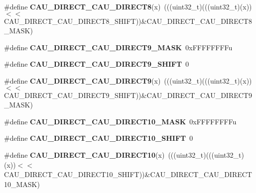\begin{DoxyCompactItemize}
\item 
\#define {\bfseries C\+A\+U\+\_\+\+D\+I\+R\+E\+C\+T\+\_\+\+C\+A\+U\+\_\+\+D\+I\+R\+E\+C\+T8}(x)~(((uint32\+\_\+t)(((uint32\+\_\+t)(x))$<$$<$C\+A\+U\+\_\+\+D\+I\+R\+E\+C\+T\+\_\+\+C\+A\+U\+\_\+\+D\+I\+R\+E\+C\+T8\+\_\+\+S\+H\+I\+FT))\&C\+A\+U\+\_\+\+D\+I\+R\+E\+C\+T\+\_\+\+C\+A\+U\+\_\+\+D\+I\+R\+E\+C\+T8\+\_\+\+M\+A\+SK)\hypertarget{group__CAU__Register__Masks_ga14f69dcb73370620d040cad8fbfa94b1}{}\label{group__CAU__Register__Masks_ga14f69dcb73370620d040cad8fbfa94b1}

\item 
\#define {\bfseries C\+A\+U\+\_\+\+D\+I\+R\+E\+C\+T\+\_\+\+C\+A\+U\+\_\+\+D\+I\+R\+E\+C\+T9\+\_\+\+M\+A\+SK}~0x\+F\+F\+F\+F\+F\+F\+F\+Fu\hypertarget{group__CAU__Register__Masks_ga5ccc68fd1b7c526efb4a5074bb8039ee}{}\label{group__CAU__Register__Masks_ga5ccc68fd1b7c526efb4a5074bb8039ee}

\item 
\#define {\bfseries C\+A\+U\+\_\+\+D\+I\+R\+E\+C\+T\+\_\+\+C\+A\+U\+\_\+\+D\+I\+R\+E\+C\+T9\+\_\+\+S\+H\+I\+FT}~0\hypertarget{group__CAU__Register__Masks_gaca4b04f898d0a3dac43986b076af6f91}{}\label{group__CAU__Register__Masks_gaca4b04f898d0a3dac43986b076af6f91}

\item 
\#define {\bfseries C\+A\+U\+\_\+\+D\+I\+R\+E\+C\+T\+\_\+\+C\+A\+U\+\_\+\+D\+I\+R\+E\+C\+T9}(x)~(((uint32\+\_\+t)(((uint32\+\_\+t)(x))$<$$<$C\+A\+U\+\_\+\+D\+I\+R\+E\+C\+T\+\_\+\+C\+A\+U\+\_\+\+D\+I\+R\+E\+C\+T9\+\_\+\+S\+H\+I\+FT))\&C\+A\+U\+\_\+\+D\+I\+R\+E\+C\+T\+\_\+\+C\+A\+U\+\_\+\+D\+I\+R\+E\+C\+T9\+\_\+\+M\+A\+SK)\hypertarget{group__CAU__Register__Masks_ga5658308db6b0a058df6a89a1300338f1}{}\label{group__CAU__Register__Masks_ga5658308db6b0a058df6a89a1300338f1}

\item 
\#define {\bfseries C\+A\+U\+\_\+\+D\+I\+R\+E\+C\+T\+\_\+\+C\+A\+U\+\_\+\+D\+I\+R\+E\+C\+T10\+\_\+\+M\+A\+SK}~0x\+F\+F\+F\+F\+F\+F\+F\+Fu\hypertarget{group__CAU__Register__Masks_ga3115929e73e7c6a2c3b24d69e6215c55}{}\label{group__CAU__Register__Masks_ga3115929e73e7c6a2c3b24d69e6215c55}

\item 
\#define {\bfseries C\+A\+U\+\_\+\+D\+I\+R\+E\+C\+T\+\_\+\+C\+A\+U\+\_\+\+D\+I\+R\+E\+C\+T10\+\_\+\+S\+H\+I\+FT}~0\hypertarget{group__CAU__Register__Masks_gadc78db3adb857bc20e4387835eabdeab}{}\label{group__CAU__Register__Masks_gadc78db3adb857bc20e4387835eabdeab}

\item 
\#define {\bfseries C\+A\+U\+\_\+\+D\+I\+R\+E\+C\+T\+\_\+\+C\+A\+U\+\_\+\+D\+I\+R\+E\+C\+T10}(x)~(((uint32\+\_\+t)(((uint32\+\_\+t)(x))$<$$<$C\+A\+U\+\_\+\+D\+I\+R\+E\+C\+T\+\_\+\+C\+A\+U\+\_\+\+D\+I\+R\+E\+C\+T10\+\_\+\+S\+H\+I\+FT))\&C\+A\+U\+\_\+\+D\+I\+R\+E\+C\+T\+\_\+\+C\+A\+U\+\_\+\+D\+I\+R\+E\+C\+T10\+\_\+\+M\+A\+SK)\hypertarget{group__CAU__Register__Masks_ga8a2c9297ddc5ff59b14e74324ecdd316}{}\label{group__CAU__Register__Masks_ga8a2c9297ddc5ff59b14e74324ecdd316}


\end{DoxyCompactItemize}
